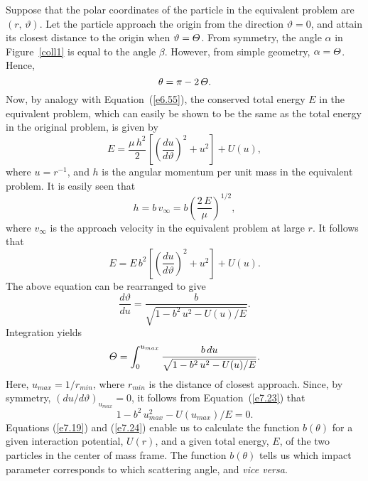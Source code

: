Suppose that the  polar coordinates of the particle in the equivalent problem 
are $(r,\,\vartheta)$. Let the particle approach the origin from the direction
$\vartheta=0$, and attain its closest distance to the origin when
$\vartheta={\mit\Theta}$. From symmetry, the angle $\alpha$ in Figure~\ref{coll1} is equal to the angle $\beta$. However, from simple geometry,
$\alpha={\mit\Theta}$. Hence,
\begin{equation}\label{e7.19}
\theta = \pi - 2\,{\mit\Theta}.
\end{equation}
Now, by analogy with Equation~(\ref{e6.55}), the conserved total energy $E$ in the equivalent
problem, which can easily be shown to be the same as the total energy in
the original problem, is given by
\begin{equation}\label{e7.20}
E = \frac{\mu\,h^2}{2}\left[\left(\frac{du}{d\vartheta}\right)^2 + u^2\right] + U(u),
\end{equation}
where $u=r^{-1}$, and $h$ is the angular momentum per unit mass in the
equivalent problem. It is easily seen that
\begin{equation}
h = b\,v_\infty = b\left(\frac{2\,E}{\mu}\right)^{1/2},
\end{equation}
where $v_\infty$ is the approach velocity in the equivalent problem
at large $r$. 
It follows that
\begin{equation}\label{e7.22}
E = E\,b^2\left[\left(\frac{du}{d\vartheta}\right)^2 + u^2\right] + U(u).
\end{equation}
The above equation can be rearranged to
give
\begin{equation}\label{e7.23}
\frac{d\vartheta}{d u } = \frac{b}{\sqrt{1 - b^2\,u^2-U(u)/E}}.
\end{equation}
Integration yields
\begin{equation}\label{e7.24}
{\mit\Theta} = \int_0^{u_{max}}\frac{b\,du}{\sqrt{1-b^2\,u^2- U(u)/E}}.
\end{equation}
Here, $u_{max}=1/r_{min}$, where $r_{min}$ is the distance of closest approach. Since, by symmetry,  $(du/d\vartheta)_{u_{max}}=0$, it follows from Equation~(\ref{e7.23}) that
\begin{equation}\label{e7.25}
1 - b^2\,u_{max}^2 - U(u_{max})/E = 0.
\end{equation}
Equations (\ref{e7.19}) and (\ref{e7.24}) enable us to calculate the
function $b(\theta)$ for a given interaction potential, $U(r)$, and a
given total energy, $E$, of the two particles  in the center of mass frame. The function $b(\theta)$
tells us which impact parameter corresponds to which scattering angle,
and {\em vice versa}. 


